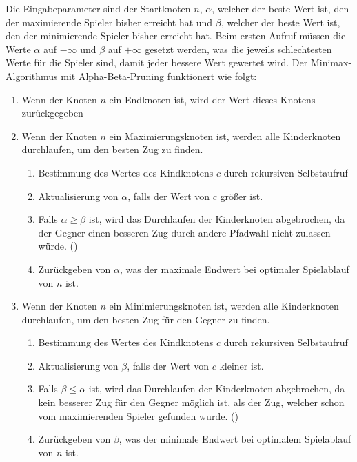 Die Eingabeparameter sind der Startknoten $n$, $\alpha$, welcher der beste Wert ist, den der maximierende Spieler bisher erreicht hat und $\beta$, welcher der beste Wert ist, den der minimierende Spieler bisher erreicht hat. Beim ersten Aufruf müssen die Werte $\alpha$ auf $-\infty$ und $\beta$ auf $+\infty$ gesetzt werden, was die jeweils schlechtesten Werte für die Spieler sind, damit jeder bessere Wert gewertet wird. Der Minimax-Algorithmus mit Alpha-Beta-Pruning funktionert wie folgt:

\begin{enumerate}
    \item Wenn der Knoten $n$ ein Endknoten ist, wird der Wert dieses Knotens zurückgegeben
    \item Wenn der Knoten $n$ ein Maximierungsknoten ist, werden alle Kinderknoten durchlaufen, um den besten Zug zu finden.
          \begin{enumerate}
              \item Bestimmung des Wertes des Kindknotens $c$ durch rekursiven Selbstaufruf
              \item Aktualisierung von $\alpha$, falls der Wert von $c$ größer ist.
              \item Falls $\alpha \geq \beta$ ist, wird das Durchlaufen der Kinderknoten abgebrochen, da der Gegner einen besseren Zug durch andere Pfadwahl nicht zulassen würde. ()
              \item Zurückgeben von $\alpha$, was der maximale Endwert bei optimaler Spielablauf von $n$ ist.
          \end{enumerate}
    \item Wenn der Knoten $n$ ein Minimierungsknoten ist, werden alle Kinderknoten durchlaufen, um den besten Zug für den Gegner zu finden.
          \begin{enumerate}
              \item Bestimmung des Wertes des Kindknotens $c$ durch rekursiven Selbstaufruf
              \item Aktualisierung von $\beta$, falls der Wert von $c$ kleiner ist.
              \item Falls $\beta \leq \alpha$ ist, wird das Durchlaufen der Kinderknoten abgebrochen, da kein besserer Zug für den Gegner möglich ist, als der Zug, welcher schon vom maximierenden Spieler  gefunden wurde. ()
              \item Zurückgeben von $\beta$, was der minimale Endwert bei optimalem Spielablauf von $n$ ist.
          \end{enumerate}
\end{enumerate}

